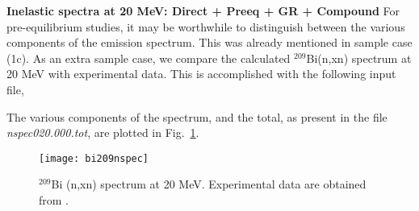 \begin{samplecase}
{\bf Inelastic spectra at 20 MeV: Direct + Preeq + GR + Compound}\newline
For pre-equilibrium studies, it may be worthwhile to distinguish between the 
various components of the emission spectrum. This was already mentioned in 
sample case (1c). As an extra sample case, we compare the calculated 
${}^{209}$Bi(n,xn) spectrum at 20 MeV with experimental data. This is 
accomplished with the following input file,


The various components of the spectrum, and the total, as present in the file
{\em nspec020.000.tot}, are plotted in Fig.~\ref{bi209nspec}.
\end{samplecase}
\begin{figure}
\centering\texttt{[image: bi209nspec]}
\caption{${}^{209}$Bi (n,xn) spectrum at 20 MeV. Experimental data are
obtained from \protect\cite{Marcinkowski1991}.}
\label{bi209nspec}
\end{figure}
